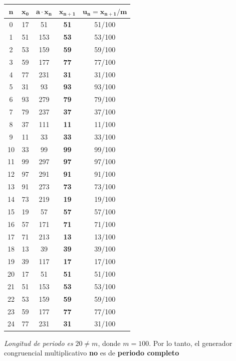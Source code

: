 \documentclass[11pt,letterpaper]{report}
\begin{document}
\begin{table}[H]
\centering
\begin{tabular}{|c|c|c|c|c|}
\hline
$\boldsymbol{n}$ & $\boldsymbol{x_0}$ & $\boldsymbol{a \cdot x_n}$ & $\boldsymbol{x_{n+1}}$ & $\boldsymbol{u_n = x_{n+1}/m}$\\
\hline
0 & 17 & 51 & \textbf{51} & 51/100\\
1 & 51 & 153 & \textbf{53} & 53/100\\
2 & 53 & 159 & \textbf{59} & 59/100\\
3 & 59 & 177 & \textbf{77} & 77/100\\
4 & 77 & 231 & \textbf{31} & 31/100\\
5 & 31 & 93 & \textbf{93} & 93/100\\
6 & 93 & 279 & \textbf{79} & 79/100\\
7 & 79 & 237 & \textbf{37} & 37/100\\
8 & 37 & 111 & \textbf{11} & 11/100\\
9 & 11 & 33 & \textbf{33} & 33/100\\
10 & 33 & 99 & \textbf{99} & 99/100\\
11 & 99 & 297 & \textbf{97} & 97/100\\
12 & 97 & 291 & \textbf{91} & 91/100\\
13 & 91 & 273 & \textbf{73} & 73/100\\
14 & 73 & 219 & \textbf{19} & 19/100\\
15 & 19 & 57 & \textbf{57} & 57/100\\
16 & 57 & 171 & \textbf{71} & 71/100\\
17 & 71 & 213 & \textbf{13} & 13/100\\
18 & 13 & 39 & \textbf{39} & 39/100\\
19 & 39 & 117 & \textbf{17} & 17/100\\
\hline
20 & 17 & 51 & \textbf{51} & 51/100\\
21 & 51 & 153 & \textbf{53} & 53/100\\
22 & 53 & 159 & \textbf{59} & 59/100\\
23 & 59 & 177 & \textbf{77} & 77/100\\
24 & 77 & 231 & \textbf{31} & 31/100\\
\hline
\end{tabular}
\end{table}

\textit{Longitud de periodo es} $20 \neq m$, donde $m = 100$. Por lo tanto, el generador congruencial multiplicativo \textbf{no} es de \textbf{periodo completo}
\end{document}
